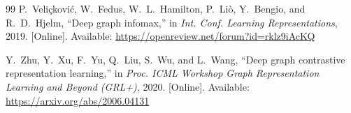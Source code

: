 \documentclass[conference]{IEEEtran}
\begin{document}
\begin{thebibliography}{99}
P.~Veli{\c{c}}kovi{\'c}, W.~Fedus, W.~L.~Hamilton, P.~Li{\`o}, Y.~Bengio, and R.~D.~Hjelm, ``Deep graph infomax,'' in \emph{Int. Conf. Learning Representations}, 2019. [Online]. Available: \url{https://openreview.net/forum?id=rklz9iAcKQ}

Y.~Zhu, Y.~Xu, F.~Yu, Q.~Liu, S.~Wu, and L.~Wang, ``Deep graph contrastive representation learning,'' in \emph{Proc. ICML Workshop Graph Representation Learning and Beyond (GRL+)}, 2020. [Online]. Available: \url{https://arxiv.org/abs/2006.04131}

\end{thebibliography}
\end{document}
